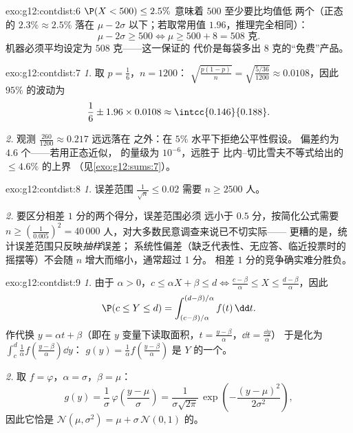 \begin{solution}{exo:g12:contdist:6}
$\P(X < 500) \leq 2.5\%$ 意味着 $500$ 至少要比均值低
两个（正态的 $2.3\% \approx 2.5\%$ 落在
$\mu - 2\sigma$ 以下；若取常用值 $1.96$，推理完全相同）：
\[
\mu - 2\sigma \geq 500 \iff \mu \geq 500 + 8 = 508 \text{ 克}.
\]
机器必须平均设定为 $508$ 克——这一保证的
代价是每袋多出 $8$ 克的“免费”产品。
\end{solution}

\begin{solution}{exo:g12:contdist:7}
\emph{1.} 取 $p = \frac16$，$n = 1200$：
$\sqrt{\frac{p(1-p)}{n}} = \sqrt{\frac{5/36}{1200}} \approx 0.0108$，因此
$95\%$ 的波动为
\[
\frac16 \pm 1.96 \times 0.0108 \approx \intcc{0.146}{0.188}.
\]

\emph{2.} 观测 $\frac{260}{1200} \approx 0.217$ 远远落在
之外：在 $5\%$ 水平下拒绝公平性假设。
偏差约为 $4.6$ 个——若用正态近似，
的量级为 $10^{-6}$，远胜于
比内–切比雪夫不等式给出的 $\leq 4.6\%$ 的上界
（见\cref{exo:g12:sums:7}）。
\end{solution}

\begin{solution}{exo:g12:contdist:8}
\emph{1.} 误差范围 $\frac{1}{\sqrt n} \leq 0.02$ 需要
$n \geq 2500$ 人。

\emph{2.} 要区分相差 $1$ 分的两个得分，误差范围必须
远小于 $0.5$ 分，按简化公式需要 $n \geq \left(\frac{1}{0.005}\right)^2 =
40\,000$ 人，对大多数民意调查来说已不切实际——
更糟的是，统计误差范围只反映\emph{抽样}误差；
系统性偏差（缺乏代表性、无应答、临近投票时的
摇摆等）不会随 $n$ 增大而缩小，通常超过 1 分。
相差 $1$ 分的竞争确实难分胜负。
\end{solution}

\begin{solution}{exo:g12:contdist:9}
\emph{1.} 由于 $\alpha > 0$，$c \leq \alpha X + \beta \leq d
\iff \frac{c - \beta}{\alpha} \leq X \leq \frac{d - \beta}{\alpha}$，因此
\[
\P(c \leq Y \leq d)
= \int_{(c-\beta)/\alpha}^{(d-\beta)/\alpha} f(t)\,\dd t .
\]
作代换 $y = \alpha t + \beta$（即在 $y$
变量下读取面积，$t = \frac{y - \beta}{\alpha}$，$\dd t = \frac{\dd y}{\alpha}$）
于是化为
$\int_c^d \frac{1}{\alpha} f\left(\frac{y-\beta}{\alpha}\right)\dd y$：
 $g(y) = \frac1\alpha f\left(\frac{y-\beta}{\alpha}\right)$ 是
$Y$ 的一个。

\emph{2.} 取 $f = \varphi$，$\alpha = \sigma$，$\beta = \mu$：
\[
g(y) = \frac{1}{\sigma}\,\varphi\!\left(\frac{y - \mu}{\sigma}\right)
= \frac{1}{\sigma\sqrt{2\pi}}\,
\exp\left(-\frac{(y-\mu)^2}{2\sigma^2}\right),
\]
因此它恰是
$\mathcal N(\mu, \sigma^2) = \mu + \sigma\,\mathcal N(0,1)$ 的。
\end{solution}

